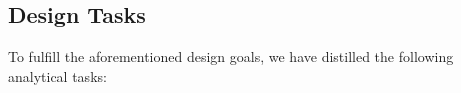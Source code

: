 

\subsection{Design Tasks}
\label{section:design_tasks}
To fulfill the aforementioned design goals, we have distilled the following analytical tasks:

